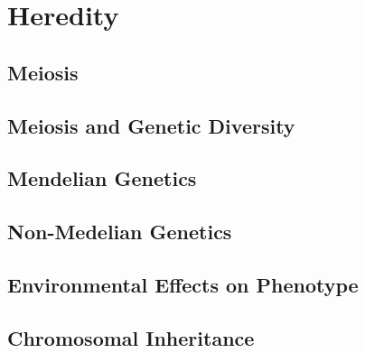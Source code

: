 \documentclass[../bio.tex]{subfiles}
\begin{document}
\chapter{Heredity}
\section{Meiosis}
\section{Meiosis and Genetic Diversity}
\section{Mendelian Genetics}
\section{Non-Medelian Genetics}
\section{Environmental Effects on Phenotype}
\section{Chromosomal Inheritance}
\end{document}
